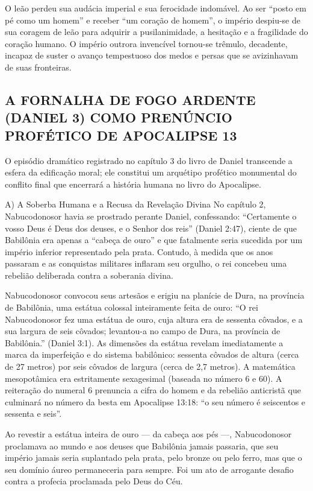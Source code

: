O leão perdeu sua audácia imperial e sua ferocidade indomável. Ao ser ``posto em pé como um homem'' e receber ``um coração de homem'', o império despiu-se de sua coragem de leão para adquirir a pusilanimidade, a hesitação e a fragilidade do coração humano. O império outrora invencível tornou-se trêmulo, decadente, incapaz de suster o avanço tempestuoso dos medos e persas que se avizinhavam de suas fronteiras.



\subsection{A FORNALHA DE FOGO ARDENTE (DANIEL 3) COMO PRENÚNCIO PROFÉTICO DE APOCALIPSE 13}


O episódio dramático registrado no capítulo 3 do livro de Daniel transcende a esfera da edificação moral; ele constitui um arquétipo profético monumental do conflito final que encerrará a história humana no livro do Apocalipse.

A) A Soberba Humana e a Recusa da Revelação Divina
No capítulo 2, Nabucodonosor havia se prostrado perante Daniel, confessando: ``Certamente o vosso Deus é Deus dos deuses, e o Senhor dos reis'' (Daniel 2:47), ciente de que Babilônia era apenas a ``cabeça de ouro'' e que fatalmente seria sucedida por um império inferior representado pela prata. Contudo, à medida que os anos passaram e as conquistas militares inflaram seu orgulho, o rei concebeu uma rebelião deliberada contra a soberania divina.

Nabucodonosor convocou seus artesãos e erigiu na planície de Dura, na província de Babilônia, uma estátua colossal inteiramente feita de ouro:
``O rei Nabucodonosor fez uma estátua de ouro, cuja altura era de sessenta côvados, e a sua largura de seis côvados; levantou-a no campo de Dura, na província de Babilônia.'' (Daniel 3:1).
As dimensões da estátua revelam imediatamente a marca da imperfeição e do sistema babilônico: sessenta côvados de altura (cerca de 27 metros) por seis côvados de largura (cerca de 2,7 metros). A matemática mesopotâmica era estritamente sexagesimal (baseada no número 6 e 60). A reiteração do numeral 6 prenuncia a cifra do homem e da rebelião anticristã que culminará no número da besta em Apocalipse 13:18: ``o seu número é seiscentos e sessenta e seis''.

Ao revestir a estátua inteira de ouro — da cabeça aos pés —, Nabucodonosor proclamava ao mundo e aos deuses que Babilônia jamais passaria, que seu império jamais seria suplantado pela prata, pelo bronze ou pelo ferro, mas que o seu domínio áureo permaneceria para sempre. Foi um ato de arrogante desafio contra a profecia proclamada pelo Deus do Céu.

